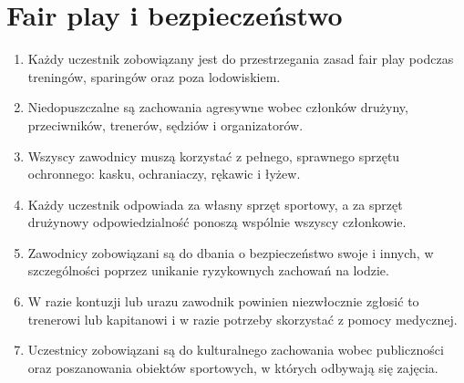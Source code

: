 \documentclass[12pt,a4paper]{article}
\let\stdsection\section
\renewcommand\section{\clearpage\stdsection}
\begin{document}
\section{Fair play i bezpieczeństwo}
\begin{enumerate}
  \item Każdy uczestnik zobowiązany jest do przestrzegania zasad fair play podczas treningów, sparingów oraz poza lodowiskiem.
  \item Niedopuszczalne są zachowania agresywne wobec członków drużyny, przeciwników, trenerów, sędziów i organizatorów.
  \item Wszyscy zawodnicy muszą korzystać z pełnego, sprawnego sprzętu ochronnego: kasku, ochraniaczy, rękawic i łyżew.
  \item Każdy uczestnik odpowiada za własny sprzęt sportowy, a za sprzęt drużynowy odpowiedzialność ponoszą wspólnie wszyscy członkowie.
  \item Zawodnicy zobowiązani są do dbania o bezpieczeństwo swoje i innych, w szczególności poprzez unikanie ryzykownych zachowań na lodzie.
  \item W razie kontuzji lub urazu zawodnik powinien niezwłocznie zgłosić to trenerowi lub kapitanowi i w razie potrzeby skorzystać z pomocy medycznej.
  \item Uczestnicy zobowiązani są do kulturalnego zachowania wobec publiczności oraz poszanowania obiektów sportowych, w których odbywają się zajęcia.
\end{enumerate}
\end{document}
